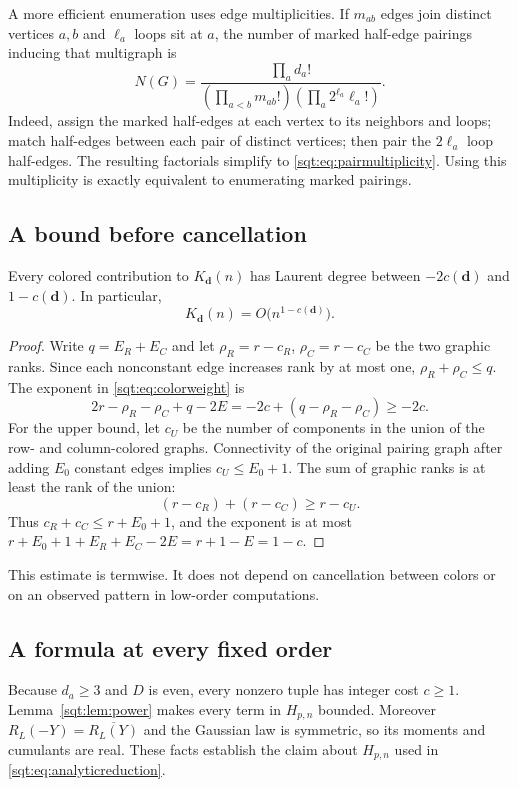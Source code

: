 A more efficient enumeration uses edge multiplicities. If $m_{ab}$ edges join distinct vertices $a,b$ and $\ell_a$ loops sit at $a$, the number of marked half-edge pairings inducing that multigraph is
\begin{equation}\label{sqt:eq:pairmultiplicity}
N(G)=\frac{\prod_a d_a!}
 {\left(\prod_{a<b}m_{ab}!\right)\left(\prod_a2^{\ell_a}\ell_a!\right)}.
\end{equation}
Indeed, assign the marked half-edges at each vertex to its neighbors and loops; match half-edges between each pair of distinct vertices; then pair the $2\ell_a$ loop half-edges. The resulting factorials simplify to \eqref{sqt:eq:pairmultiplicity}. Using this multiplicity is exactly equivalent to enumerating marked pairings.

\subsection{A bound before cancellation}
\begin{lemma}\label{sqt:lem:power}
Every colored contribution to $K_{\boldsymbol d}(n)$ has Laurent degree between $-2c(\boldsymbol d)$ and $1-c(\boldsymbol d)$. In particular,
\begin{equation}\label{sqt:eq:powerbound}
K_{\boldsymbol d}(n)=O\bigl(n^{1-c(\boldsymbol d)}\bigr).
\end{equation}
\end{lemma}
\begin{proof}
Write $q=E_R+E_C$ and let $\rho_R=r-c_R$, $\rho_C=r-c_C$ be the two graphic ranks. Since each nonconstant edge increases rank by at most one,
$\rho_R+\rho_C\leq q$. The exponent in \eqref{sqt:eq:colorweight} is
\[
2r-\rho_R-\rho_C+q-2E
 =-2c+(q-\rho_R-\rho_C)\geq-2c.
\]
For the upper bound, let $c_U$ be the number of components in the union of the row- and column-colored graphs. Connectivity of the original pairing graph after adding $E_0$ constant edges implies $c_U\leq E_0+1$. The sum of graphic ranks is at least the rank of the union:
\[
(r-c_R)+(r-c_C)\geq r-c_U.
\]
Thus $c_R+c_C\leq r+E_0+1$, and the exponent is at most
$r+E_0+1+E_R+E_C-2E=r+1-E=1-c$.
\end{proof}
This estimate is termwise. It does not depend on cancellation between colors or on an observed pattern in low-order computations.

\subsection{A formula at every fixed order}
Because $d_a\geq3$ and $D$ is even, every nonzero tuple has integer cost $c\geq1$. Lemma~\ref{sqt:lem:power} makes every term in $H_{p,n}$ bounded. Moreover $R_L(-Y)=\overline{R_L(Y)}$ and the Gaussian law is symmetric, so its moments and cumulants are real. These facts establish the claim about $H_{p,n}$ used in \eqref{sqt:eq:analyticreduction}.

